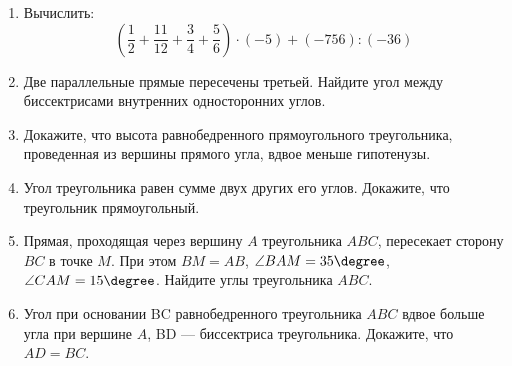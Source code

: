 \documentclass[12pt, a4paper]{article}
\begin{document}
		

\begin{enumerate}
	\item Вычислить: $$\left(\dfrac{1}{2}+\dfrac{11}{12}+\dfrac{3}{4}+\dfrac{5}{6}\right)\cdot(-5)+(-756):(-36)$$
	\item Две параллельные прямые пересечены третьей. Найдите угол между биссектрисами внутренних односторонних углов.
	\item Докажите, что высота равнобедренного прямоугольного треугольника, проведенная из вершины прямого угла, вдвое меньше гипотенузы.
	\item Угол треугольника равен сумме двух других его углов. Докажите, что треугольник прямоугольный.
	\item Прямая, проходящая через вершину $A$ треугольника $ABC$, пересекает сторону $BC$ в точке $M$. При этом $BM = AB$, $\angle BAM = 35\degree$, $\angle CAM = 15\degree$. Найдите углы треугольника $ABC$.
	\item Угол при основании BC равнобедренного треугольника $ABC$ вдвое больше угла при вершине $A$, BD — биссектриса треугольника. Докажите, что $AD = BC$.
\end{enumerate}
\end{document}
